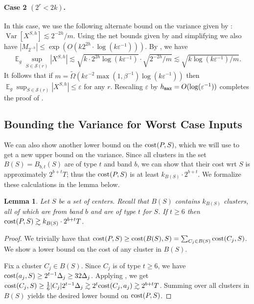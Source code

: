 \documentclass[11pt]{article}
\newtheorem{lemma}{Lemma}[section]
\theoremstyle{restate}
\theoremstyle{definition}
\newcommand{\eps}{\ensuremath{\varepsilon}}
\DeclareMathOperator*{\var}{\mathrm{Var}}
\newcommand{\E}{\mathop{\mathbb{E}}}
\newcommand{\cost}{\textnormal{cost}}
\newcommand{\hmax}{h_\ensuremath{\textnormal{\texttt{max}}}}
\begin{document}
\paragraph{Case 2 $(2^r < 2k)$.}
In this case, we use the following alternate bound on the variance given by : $\var[X^{S,h}] \lesssim 2^{-2h}/m$. Using the net bounds given by  and simplifying we also have $ |M_{2^{-h}}|  \leq \exp(O(k2^{2h} \cdot \log(k \eps^{-1})))$. By , we have 
\begin{align*}
\E_g \sup_{S \in \mathcal{S}(r)} |X^{S,h}|\lesssim \sqrt{k \cdot 2^{2h} \log(k \eps^{-1})} \cdot \sqrt{2^{-2h}/m}   \lesssim \sqrt{k \log(k \eps^{-1})/m}.
\end{align*}
It follows that if $m = \tilde{\Omega}(k \eps^{-2}\max(1, \beta^{-1}) \log(k \eps^{-1}))$ then $\E_g \sup_{S \in \mathcal{S}(r)} |X^{S,h}| \leq \eps$ for any $r$. Rescaling $\eps$ by ${\hmax = O(\log(\eps^{-1}))}$ completes the proof of .





\subsection{Bounding the Variance for Worst Case Inputs} \label{sec:worst-case-variance}
We can also show another lower bound on the $\cost(P,S)$, which we will use to get a new upper bound on the variance. Since all clusters in the set $B(S) = B_{b,t}(S)$ are of type $t$ and band $b$, we can show that their cost wrt $S$ is approximately $2^{b+t} T$; thus the $\cost(P,S)$ is at least $k_{B(S)} \cdot 2^{b+t}$. We formalize these calculations in the lemma below. 
\begin{lemma}\label{lem: structured-cost}
 Let $S$ be a set of centers. Recall that $B(S)$ contains $k_{B(S)}$ clusters, all of which are from band $b$ and are of type $t$ for $S$. If $t\geq 6$ then $\cost(P,S) \gtrsim k_{B(S)} \cdot 2^{b+t}T$.
\end{lemma}
\begin{proof} 
    We trivially have that $\cost(P,S) \geq \cost(B(S), S) = \sum_{C_j \in B(S)} \cost(C_j, S)$. We show a lower bound on the cost of any cluster in $B(S)$.
    
    Fix a cluster $C_j \in B(S)$. Since $C_j$ is of type $t \geq 6$, we have $\cost(a_j,S) \geq 2^{t-1} \Delta_j \geq 32\Delta_j$. Applying , we get $\cost(C_j,S) \geq \tfrac{1}{6}|C_j| 2^{t-1} \Delta_j \gtrsim 2^t \cost(C_j,a_j) \gtrsim 2^{b+t}T$. Summing over all clusters in $B(S)$ yields the desired lower bound on $\cost(P,S)$.
\end{proof}
\end{document}
